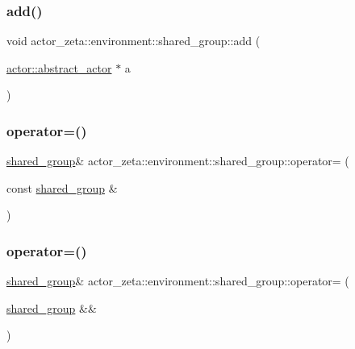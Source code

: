 \subsubsection{\texorpdfstring{add()}{add()}}
{\footnotesize\ttfamily void actor\+\_\+zeta\+::environment\+::shared\+\_\+group\+::add (\begin{DoxyParamCaption}\item[{\hyperlink{classactor__zeta_1_1actor_1_1abstract__actor}{actor\+::abstract\+\_\+actor} $\ast$}]{a }\end{DoxyParamCaption})}

\mbox{\label{classactor__zeta_1_1environment_1_1shared__group_a9dcb7f4adcad7c66ac43d65b5800f24d}} 
\subsubsection{\texorpdfstring{operator=()}{operator=()}\hspace{0.1cm}{\footnotesize\ttfamily [1/2]}}
{\footnotesize\ttfamily \hyperlink{classactor__zeta_1_1environment_1_1shared__group}{shared\+\_\+group}\& actor\+\_\+zeta\+::environment\+::shared\+\_\+group\+::operator= (\begin{DoxyParamCaption}\item[{const \hyperlink{classactor__zeta_1_1environment_1_1shared__group}{shared\+\_\+group} \&}]{ }\end{DoxyParamCaption})\hspace{0.3cm}{\ttfamily [delete]}}

\mbox{\label{classactor__zeta_1_1environment_1_1shared__group_a00439854585c059d8e4e0fc29ae8c5da}} 
\subsubsection{\texorpdfstring{operator=()}{operator=()}\hspace{0.1cm}{\footnotesize\ttfamily [2/2]}}
{\footnotesize\ttfamily \hyperlink{classactor__zeta_1_1environment_1_1shared__group}{shared\+\_\+group}\& actor\+\_\+zeta\+::environment\+::shared\+\_\+group\+::operator= (\begin{DoxyParamCaption}\item[{\hyperlink{classactor__zeta_1_1environment_1_1shared__group}{shared\+\_\+group} \&\&}]{ }\end{DoxyParamCaption})\hspace{0.3cm}{\ttfamily [default]}}

